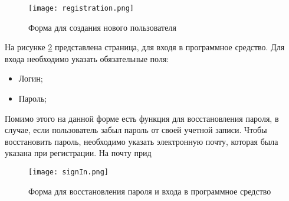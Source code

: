 \begin{figure}[!htb]
	\centering
	\texttt{[image: registration.png]}
	\caption{ Форма для создания нового пользователя }
	\label{fig:sec_usage::reg}
\end{figure}

На рисунке \ref{fig:sec_usage::signIn} представлена страница, для входя в программное средство. Для входа необходимо указать обязательные поля:

\begin{itemize}
	\item Логин; 
	\item Пароль;
\end{itemize}

Помимо этого на данной форме есть функция для восстановления пароля, в случае, если пользователь забыл пароль от своей учетной записи. Чтобы восстановить пароль, необходимо указать электронную почту, которая была указана при регистрации. На почту прид

\begin{figure}[!htb]
	\centering
	\texttt{[image: signIn.png]}
	\caption{ Форма для восстановления пароля и входа в программное средство}
	\label{fig:sec_usage::signIn}
\end{figure}


\clearpage

